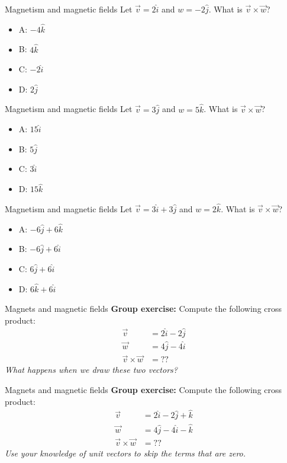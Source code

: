 \documentclass{beamer}
\begin{document}
\begin{frame}{Magnetism and magnetic fields}
Let $\vec{v} = 2\hat{i}$ and $w = -2 \hat{j}$.  What is $\vec{v} \times \vec{w}$?
\begin{itemize}
\item A: $-4 \hat{k}$
\item B: $4 \hat{k}$
\item C: $-2 \hat{i}$
\item D: $2 \hat{j}$
\end{itemize}
\end{frame}

\begin{frame}{Magnetism and magnetic fields}
Let $\vec{v} = 3\hat{j}$ and $w = 5 \hat{k}$.  What is $\vec{v} \times \vec{w}$?
\begin{itemize}
\item A: $15 \hat{i}$
\item B: $5 \hat{j}$
\item C: $3 \hat{i}$
\item D: $15 \hat{k}$
\end{itemize}
\end{frame}

\begin{frame}{Magnetism and magnetic fields}
Let $\vec{v} = 3\hat{i} + 3\hat{j}$ and $w = 2 \hat{k}$.  What is $\vec{v} \times \vec{w}$?
\begin{itemize}
\item A: $-6 \hat{j} + 6\hat{k}$
\item B: $-6 \hat{j} + 6\hat{i}$
\item C: $6 \hat{j} + 6\hat{i}$
\item D: $6 \hat{k} + 6\hat{i}$
\end{itemize}
\end{frame}

\begin{frame}{Magnets and magnetic fields}
\textbf{Group exercise:} Compute the following cross product:
\begin{align}
\vec{v} &= 2\hat{i}-2\hat{j} \\
\vec{w} &= 4\hat{j}-4\hat{i} \\
\vec{v} \times \vec{w} &= ??
\end{align}
\textit{What happens when we draw these two vectors?}
\end{frame}

\begin{frame}{Magnets and magnetic fields}
\textbf{Group exercise:} Compute the following cross product:
\begin{align}
\vec{v} &= 2\hat{i}-2\hat{j}+\hat{k} \\
\vec{w} &= 4\hat{j}-4\hat{i}-\hat{k} \\
\vec{v} \times \vec{w} &= ??
\end{align}
\textit{Use your knowledge of unit vectors to skip the terms that are zero.}
\end{frame}
\end{document}
